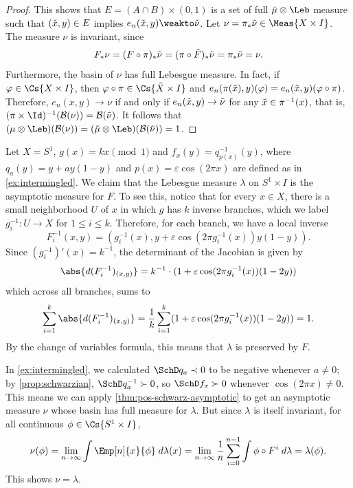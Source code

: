 \documentclass[../main]{subfiles}
\begin{document}
\begin{proof}
  This shows that \(E = (A \cap B) \times (0, 1)\) is a set of full \(\emu \otimes \Leb\) measure such that \((\tilde x, y) \in E\) implies \(e_n(\ex, y) \weakto \enu\). Let \(\nu = \pi_* \enu \in \Meas{X \times I}\). The measure \(\nu\) is invariant, since
  \[F_* \nu = (F \circ \pi)_* \tilde \nu = (\pi \circ \tilde F)_* \tilde \nu = \pi_*\tilde \nu = \nu.\]
  Furthermore, the basin of \(\nu\) has full Lebesgue measure. In fact, if \(\varphi \in \Cs{X \times I}\), then \(\varphi \circ \pi \in \Cs{\eX \times I}\) and \(e_n(\pi(\tilde x), y)(\varphi) = e_n(\tilde x, y)(\varphi \circ \pi)\). Therefore, \(e_n(x, y) \to \nu\) if and only if \(e_n(\tilde x, y) \to \tilde \nu\) for any \(\tilde x \in \pi^{-1}(x)\), that is, \((\pi \times \Id)^{-1}(\mathcal{B}(\nu)) = \mathcal{B}(\enu)\). It follows that \((\mu \otimes \Leb)(\mathcal{B}(\nu)) = (\emu \otimes \Leb)(\mathcal{B}(\enu)) = 1\).
\end{proof}

\begin{example}
  Let \(X = S^1\), \(g(x) = kx \pmod{1}\) and \(f_x(y) = q_{p(x)}^{-1}(y)\), where \(q_a(y) = y + ay(1 - y)\) and \(p(x) = \varepsilon \cos(2 \pi x)\) are defined as in \cref{ex:intermingled}. We claim that the Lebesgue measure \(\lambda\) on \(S^1\times I\) is the asymptotic measure for \(F\). To see this, notice that for every \(x \in X\), there is a small neighborhood \(U\) of \(x\) in which \(g\) has \(k\) inverse branches, which we label \(g_i^{-1} \colon U \to X\) for \(1 \le i \le k\). Therefore, for each branch, we have a local inverse
  \begin{equation*}
    F^{-1}_i(x,y) = (g_i^{-1}(x), y + \varepsilon \cos(2 \pi g^{-1}_i(x))y(1 - y)).
  \end{equation*}
  Since \((g_i^{-1})'(x) = k^{-1}\), the determinant of the Jacobian is given by
  \begin{equation*}
    \abs{d(F^{-1}_i)_{(x,y)}} =
      k^{-1} \cdot (1 + \varepsilon \cos (2\pi g_i^{-1}(x))(1 - 2y))
  \end{equation*}
  which across all branches, sums to
  \begin{equation*}
    \sum_{i = 1}^k
    \abs{d(F^{-1}_i)_{(x,y)}} =
    \frac{1}{k}\sum_{i = 1}^k
    (1 + \varepsilon \cos (2\pi g_i^{-1}(x))(1 - 2y)) = 1.
  \end{equation*}
  By the change of variables formula, this means that \(\lambda\) is preserved by \(F\).

  In \cref{ex:intermingled}, we calculated \(\SchD q_a \prec 0\) to be negative whenever \(a \neq 0\); by \cref{prop:schwarzian}, \(\SchD q_a^{-1} \succ 0\), so \(\SchD f_x \succ 0\) whenever \(\cos (2\pi x) \neq 0\). This means we can apply \cref{thm:pos-schwarz-asymptotic} to get an asymptotic measure \(\nu\) whose basin has full measure for \(\lambda\). But since \(\lambda\) is itself invariant, for all continuous \(\phi \in \Cs{S^1 \times I}\),
  \begin{equation*}
    \nu(\phi) = \lim_{n \to \infty} \int \Emp[n]{x}{\phi} \;d\lambda(x) = \lim_{n \to \infty} \frac{1}{n}\sum_{i = 0}^{n - 1} \int \phi \circ F^i \;d\lambda = \lambda(\phi).
  \end{equation*}
  This shows \(\nu = \lambda\).
\end{example}
\end{document}
